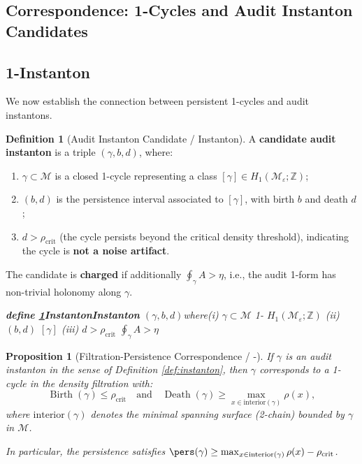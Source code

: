\documentclass[11pt,a4paper]{article}
\theoremstyle{plain}
\newtheorem{proposition}[theorem]{Proposition}
\theoremstyle{definition}
\newtheorem{definition}[theorem]{Definition}
\DeclareMathOperator{\Birth}{Birth}
\DeclareMathOperator{\Death}{Death}
\newcommand{\Z}{\mathbb{Z}}
\newcommand{\cM}{\mathcal{M}}
\begin{document}
\subsection{Correspondence: 1-Cycles and Audit Instanton Candidates}
\subsection*{1-Instanton}

We now establish the connection between persistent 1-cycles and audit instantons.

\begin{definition}[Audit Instanton Candidate / Instanton]
\label{def:candidate}
A \textbf{candidate audit instanton} is a triple $(\gamma, b, d)$, where:
\begin{enumerate}[label=(\roman*)]
  \item $\gamma \subset \cM$ is a closed 1-cycle representing a class 
        $[\gamma] \in H_1(\cM_{\varepsilon}; \Z)$;
  \item $(b, d)$ is the persistence interval associated to $[\gamma]$, 
        with birth $b$ and death $d$;
  \item $d > \rho_{\text{crit}}$ (the cycle persists beyond the critical 
        density threshold), indicating the cycle is \textbf{not a noise artifact}.
\end{enumerate}
The candidate is \textbf{charged} if additionally $\oint_{\gamma} A > \eta$, 
i.e., the audit 1-form has non-trivial holonomy along $\gamma$.
\end{definition}

\bigskip
\noindent
\textit{\textbf{define \ref{def:candidate}Instanton}\textbf{Instanton} $(\gamma, b, d)$where(i) $\gamma \subset \cM$ 1- $H_1(\cM_{\varepsilon}; \Z)$ (ii) $(b, d)$  $[\gamma]$ (iii) $d > \rho_{\text{crit}}$ $\oint_{\gamma} A > \eta$\textbf{}}

\begin{proposition}[Filtration-Persistence Correspondence / -]
\label{prop:filtration}
If $\gamma$ is an audit instanton in the sense of Definition \ref{def:instanton}, 
then $\gamma$ corresponds to a 1-cycle in the density filtration with:
\begin{equation}
  \Birth(\gamma) \leq \rho_{\text{crit}} \quad \text{and} \quad 
  \Death(\gamma) \geq \max_{x \in \text{interior}(\gamma)} \rho(x),
  \label{eq:birthdeath}
\end{equation}
where $\text{interior}(\gamma)$ denotes the minimal spanning surface (2-chain) 
bounded by $\gamma$ in $\cM$.

In particular, the persistence satisfies 
$\pers(\gamma) \geq \max_{x \in \text{interior}(\gamma)} \rho(x) - \rho_{\text{crit}}$.
\end{proposition}
\end{document}
